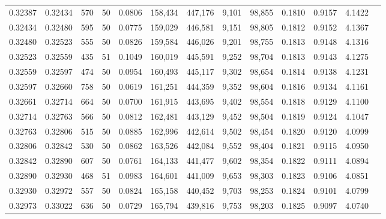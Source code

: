 \begin{tabular}{rrrrrrrrrrrrr}
0.32387 & 0.32434 &   570 &  50 &                                     0.0806 & 158,434 & 447,176 &   9,101 &  98,855 & 0.1810 & 0.9157 & 4.1422 \\
0.32434 & 0.32480 &   595 &  50 &                                     0.0775 & 159,029 & 446,581 &   9,151 &  98,805 & 0.1812 & 0.9152 & 4.1367 \\
0.32480 & 0.32523 &   555 &  50 &                                     0.0826 & 159,584 & 446,026 &   9,201 &  98,755 & 0.1813 & 0.9148 & 4.1316 \\
0.32523 & 0.32559 &   435 &  51 &                                     0.1049 & 160,019 & 445,591 &   9,252 &  98,704 & 0.1813 & 0.9143 & 4.1275 \\
0.32559 & 0.32597 &   474 &  50 &                                     0.0954 & 160,493 & 445,117 &   9,302 &  98,654 & 0.1814 & 0.9138 & 4.1231 \\
0.32597 & 0.32660 &   758 &  50 &                                     0.0619 & 161,251 & 444,359 &   9,352 &  98,604 & 0.1816 & 0.9134 & 4.1161 \\
0.32661 & 0.32714 &   664 &  50 &                                     0.0700 & 161,915 & 443,695 &   9,402 &  98,554 & 0.1818 & 0.9129 & 4.1100 \\
0.32714 & 0.32763 &   566 &  50 &                                     0.0812 & 162,481 & 443,129 &   9,452 &  98,504 & 0.1819 & 0.9124 & 4.1047 \\
0.32763 & 0.32806 &   515 &  50 &                                     0.0885 & 162,996 & 442,614 &   9,502 &  98,454 & 0.1820 & 0.9120 & 4.0999 \\
0.32806 & 0.32842 &   530 &  50 &                                     0.0862 & 163,526 & 442,084 &   9,552 &  98,404 & 0.1821 & 0.9115 & 4.0950 \\
0.32842 & 0.32890 &   607 &  50 &                                     0.0761 & 164,133 & 441,477 &   9,602 &  98,354 & 0.1822 & 0.9111 & 4.0894 \\
0.32890 & 0.32930 &   468 &  51 &                                     0.0983 & 164,601 & 441,009 &   9,653 &  98,303 & 0.1823 & 0.9106 & 4.0851 \\
0.32930 & 0.32972 &   557 &  50 &                                     0.0824 & 165,158 & 440,452 &   9,703 &  98,253 & 0.1824 & 0.9101 & 4.0799 \\
0.32973 & 0.33022 &   636 &  50 &                                     0.0729 & 165,794 & 439,816 &   9,753 &  98,203 & 0.1825 & 0.9097 & 4.0740 \\

\end{tabular}

